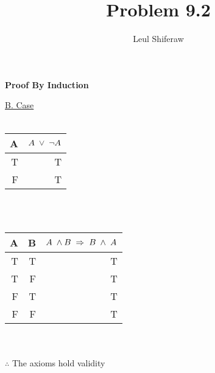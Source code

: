 \documentclass{article}
\title{Problem 9.2}
\author{Leul Shiferaw}
\begin{document}
	\maketitle
	\newpage
	
	\begin{flushleft}
		\textbf{Proof By Induction}\\
	\end{flushleft}
	\underline{B. Case}\\\\
	\begin{tabular}{|r|r|}
		\hline
		A & $A \hspace{0.1cm} \vee \hspace{0.1cm} \neg A$\\
		\hline
		T & T \\
		F & T\\
		\hline
	\end{tabular}
	\\\\
	\begin{tabular}{|r|r|r|}
		\hline
		A & B & $A \hspace{0.1cm} \wedge B \hspace{0.1cm} \Rightarrow \hspace{0.1cm} B \hspace{0.1cm} \wedge \hspace{0.1cm} A$\\
		\hline
		T & T & T\\
		T & F & T\\
		F & T & T\\
		F & F & T\\
		\hline
	\end{tabular}
	\\\\$\therefore$ The axioms hold validity 
	
\end{document}
